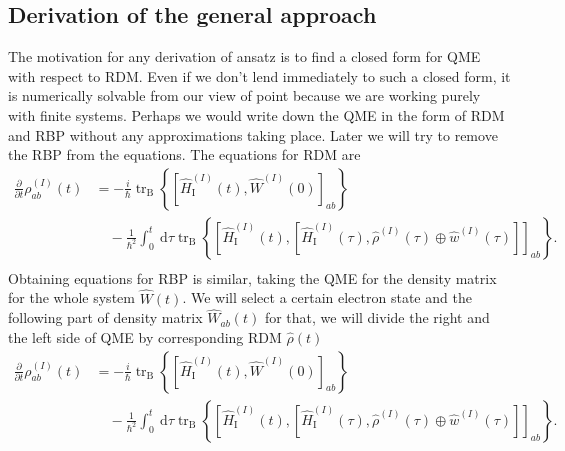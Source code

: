 \subsection{Derivation of the general approach}
The motivation for any derivation of ansatz is to find a closed form for QME with respect to RDM. Even if we don't lend immediately to such a closed form, it is numerically solvable from our view of point because we are working purely with finite systems. Perhaps we would write down the QME in the form of RDM and RBP without any approximations taking place. Later we will try to remove the RBP from the equations. The equations for RDM are
\begin{equation}
\label{QME_RDM}
    \begin{aligned}
    \frac{\partial}{\partial t} \rho^{(I)}_{ab}(t)
    &=-\frac{i}{\hbar}\operatorname{tr}_{\mathrm{B}}\left\{\left[\hat{H}_{\mathrm{I}}^{(I)}(t), \hat{W}^{(I)}(0)\right]_{ab}\right\} \\
    &\quad-\frac{1}{\hbar^{2}} \int_{0}^{t} \mathrm{~d} \tau\operatorname{tr}_{\mathrm{B}}\left\{\left[\hat{H}_{\mathrm{I}}^{(I)}(t),\left[\hat{H}_{\mathrm{I}}^{(I)}(\tau), \hat{\rho}^{(I)}(\tau) \oplus \hat{w}^{(I)}(\tau)\right]\right]_{ab}\right\}. \\
    \end{aligned}
\end{equation}
Obtaining equations for RBP is similar, taking the QME for the density matrix for the whole system $\hat{W}(t)$. We will select a certain electron state and the following part of density matrix $\hat{W}_{ab}(t)$ for that, we will divide the right and the left side of QME by corresponding RDM $\hat{\rho}(t)$
\begin{equation}
    \begin{aligned}
    \frac{\partial}{\partial t} \rho^{(I)}_{ab}(t)
    &=-\frac{i}{\hbar}\operatorname{tr}_{\mathrm{B}}\left\{\left[\hat{H}_{\mathrm{I}}^{(I)}(t), \hat{W}^{(I)}(0)\right]_{ab}\right\} \\
    &\quad-\frac{1}{\hbar^{2}} \int_{0}^{t} \mathrm{~d} \tau\operatorname{tr}_{\mathrm{B}}\left\{\left[\hat{H}_{\mathrm{I}}^{(I)}(t),\left[\hat{H}_{\mathrm{I}}^{(I)}(\tau), \hat{\rho}^{(I)}(\tau) \oplus \hat{w}^{(I)}(\tau)\right]\right]_{ab}\right\}. \\
    \end{aligned}
\end{equation}

